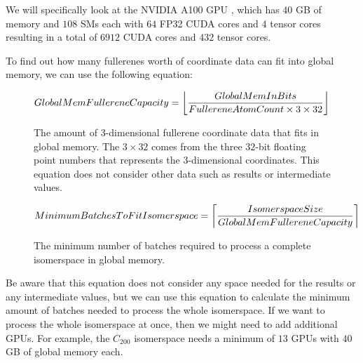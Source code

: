 


We will specifically look at the NVIDIA A100 GPU \cite{nvidia-a100-architecture}, which has $40$ GB of memory and $108$ SMs each with $64$ FP32 CUDA cores and $4$ tensor cores resulting in a total of $6912$ CUDA cores and $432$ tensor cores.

To find out how many fullerenes worth of coordinate data can fit into global memory, we can use the following equation:

\begin{figure}[H]
\begin{equation}
\begin{split}
        GlobalMemFullereneCapacity &= \floor*{\frac{GlobalMemInBits}{FullereneAtomCount \times 3 \times 32}}
\end{split}
\end{equation}
\caption{The amount of 3-dimensional fullerene coordinate data that fits in global memory. The $3 \times 32$ comes from the three $32$-bit floating point numbers that represents the 3-dimensional coordinates. This equation does not consider other data such as results or intermediate values.}
\end{figure}

\begin{figure}[H]
\begin{equation}
\begin{split}
        MinimumBatchesToFitIsomerspace &= \ceil*{\frac{IsomerspaceSize}{GlobalMemFullereneCapacity}}
\end{split}
\end{equation}
\caption{The minimum number of batches required to process a complete isomerspace in global memory.}
\end{figure}

Be aware that this equation does not consider any space needed for the results or any intermediate values, but we can use this equation to calculate the minimum amount of batches needed to process the whole isomerspace. If we want to process the whole isomerspace at once, then we might need to add additional GPUs. For example, the $C_{200}$ isomerspace needs a minimum of $13$ GPUs with $40$ GB of global memory each.

